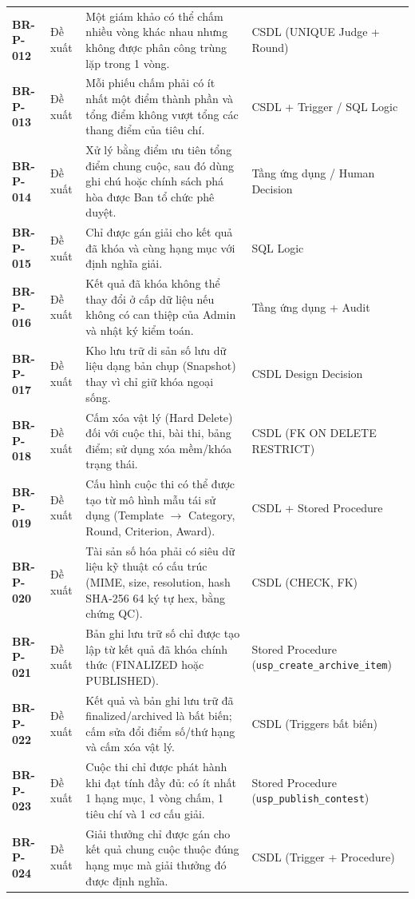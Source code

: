 \begin{table}[!ht]
\begin{tabularx}{\textwidth}{p{2.0cm}p{1.6cm}>{\raggedright\arraybackslash}Xp{3.8cm}}
\textbf{BR-P-012} & Đề xuất & Một giám khảo có thể chấm nhiều vòng khác nhau nhưng không được phân công trùng lặp trong 1 vòng. & CSDL (UNIQUE Judge + Round) \\
\textbf{BR-P-013} & Đề xuất & Mỗi phiếu chấm phải có ít nhất một điểm thành phần và tổng điểm không vượt tổng các thang điểm của tiêu chí. & CSDL + Trigger / SQL Logic \\
\textbf{BR-P-014} & Đề xuất & Xử lý bằng điểm ưu tiên tổng điểm chung cuộc, sau đó dùng ghi chú hoặc chính sách phá hòa được Ban tổ chức phê duyệt. & Tầng ứng dụng / Human Decision \\
\textbf{BR-P-015} & Đề xuất & Chỉ được gán giải cho kết quả đã khóa và cùng hạng mục với định nghĩa giải. & SQL Logic \\
\textbf{BR-P-016} & Đề xuất & Kết quả đã khóa không thể thay đổi ở cấp dữ liệu nếu không có can thiệp của Admin và nhật ký kiểm toán. & Tầng ứng dụng + Audit \\
\textbf{BR-P-017} & Đề xuất & Kho lưu trữ di sản số lưu dữ liệu dạng bản chụp (Snapshot) thay vì chỉ giữ khóa ngoại sống. & CSDL Design Decision \\
\textbf{BR-P-018} & Đề xuất & Cấm xóa vật lý (Hard Delete) đối với cuộc thi, bài thi, bảng điểm; sử dụng xóa mềm/khóa trạng thái. & CSDL (FK ON DELETE RESTRICT) \\
\textbf{BR-P-019} & Đề xuất & Cấu hình cuộc thi có thể được tạo từ mô hình mẫu tái sử dụng (Template $\rightarrow$ Category, Round, Criterion, Award). & CSDL + Stored Procedure \\
\textbf{BR-P-020} & Đề xuất & Tài sản số hóa phải có siêu dữ liệu kỹ thuật có cấu trúc (MIME, size, resolution, hash SHA-256 64 ký tự hex, bằng chứng QC). & CSDL (CHECK, FK) \\
\textbf{BR-P-021} & Đề xuất & Bản ghi lưu trữ số chỉ được tạo lập từ kết quả đã khóa chính thức (FINALIZED hoặc PUBLISHED). & Stored Procedure (\texttt{usp\_create\_archive\_item}) \\
\textbf{BR-P-022} & Đề xuất & Kết quả và bản ghi lưu trữ đã finalized/archived là bất biến; cấm sửa đổi điểm số/thứ hạng và cấm xóa vật lý. & CSDL (Triggers bất biến) \\
\textbf{BR-P-023} & Đề xuất & Cuộc thi chỉ được phát hành khi đạt tính đầy đủ: có ít nhất 1 hạng mục, 1 vòng chấm, 1 tiêu chí và 1 cơ cấu giải. & Stored Procedure (\texttt{usp\_publish\_contest}) \\
\textbf{BR-P-024} & Đề xuất & Giải thưởng chỉ được gán cho kết quả chung cuộc thuộc đúng hạng mục mà giải thưởng đó được định nghĩa. & CSDL (Trigger + Procedure) \\
\bottomrule
\end{tabularx}
\end{table}

